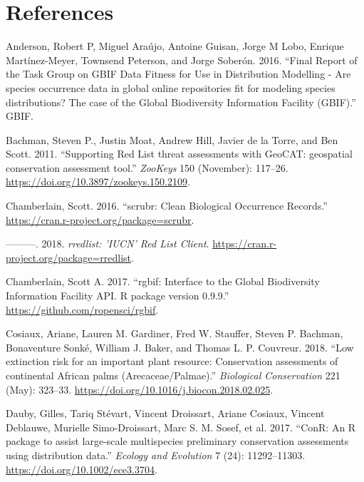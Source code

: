 \documentclass[fleqn,10pt,lineno]{wlpeerj} %
\begin{document}
\hypertarget{references}{%
\section*{References}\label{references}}

\hypertarget{refs}{}
\leavevmode\hypertarget{ref-Anderson2016}{}%
Anderson, Robert P, Miguel Araújo, Antoine Guisan, Jorge M Lobo, Enrique Martínez-Meyer, Townsend Peterson, and Jorge Soberón. 2016. ``Final Report of the Task Group on GBIF Data Fitness for Use in Distribution Modelling - Are species occurrence data in global online repositories fit for modeling species distributions? The case of the Global Biodiversity Information Facility (GBIF).'' GBIF.

\leavevmode\hypertarget{ref-Bachman2011}{}%
Bachman, Steven P., Justin Moat, Andrew Hill, Javier de la Torre, and Ben Scott. 2011. ``Supporting Red List threat assessments with GeoCAT: geospatial conservation assessment tool.'' \emph{ZooKeys} 150 (November): 117--26. \url{https://doi.org/10.3897/zookeys.150.2109}.

\leavevmode\hypertarget{ref-Chamberlain2016}{}%
Chamberlain, Scott. 2016. ``scrubr: Clean Biological Occurrence Records.'' \url{https://cran.r-project.org/package=scrubr}.

\leavevmode\hypertarget{ref-Chamberlain2018}{}%
---------. 2018. \emph{rredlist: 'IUCN' Red List Client}. \url{https://cran.r-project.org/package=rredlist}.

\leavevmode\hypertarget{ref-Chamberlain2017}{}%
Chamberlain, Scott A. 2017. ``rgbif: Interface to the Global Biodiversity Information Facility API. R package version 0.9.9.'' \url{https://github.com/ropensci/rgbif}.

\leavevmode\hypertarget{ref-Cosiaux2018}{}%
Cosiaux, Ariane, Lauren M. Gardiner, Fred W. Stauffer, Steven P. Bachman, Bonaventure Sonké, William J. Baker, and Thomas L. P. Couvreur. 2018. ``Low extinction risk for an important plant resource: Conservation assessments of continental African palms (Arecaceae/Palmae).'' \emph{Biological Conservation} 221 (May): 323--33. \url{https://doi.org/10.1016/j.biocon.2018.02.025}.

\leavevmode\hypertarget{ref-Dauby2017}{}%
Dauby, Gilles, Tariq Stévart, Vincent Droissart, Ariane Cosiaux, Vincent Deblauwe, Murielle Simo-Droissart, Marc S. M. Sosef, et al. 2017. ``ConR: An R package to assist large-scale multispecies preliminary conservation assessments using distribution data.'' \emph{Ecology and Evolution} 7 (24): 11292--11303. \url{https://doi.org/10.1002/ece3.3704}.
\end{document}
